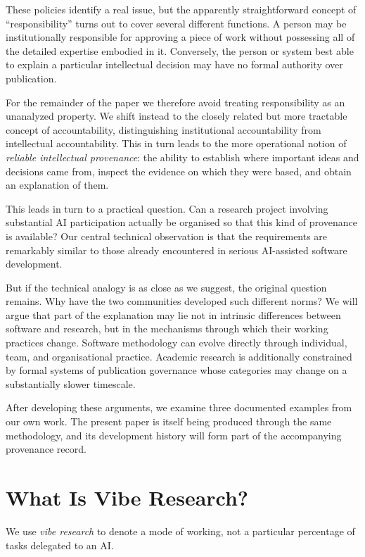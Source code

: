 These policies identify a real issue, but the apparently straightforward concept of ``responsibility'' turns out to cover several different functions. A person may be institutionally responsible for approving a piece of work without possessing all of the detailed expertise embodied in it. Conversely, the person or system best able to explain a particular intellectual decision may have no formal authority over publication.

For the remainder of the paper we therefore avoid treating responsibility as an unanalyzed property. We shift instead to the closely related but more tractable concept of accountability, distinguishing institutional accountability from intellectual accountability. This in turn leads to the more operational notion of \emph{reliable intellectual provenance}: the ability to establish where important ideas and decisions came from, inspect the evidence on which they were based, and obtain an explanation of them.

This leads in turn to a practical question. Can a research project involving substantial AI participation actually be organised so that this kind of provenance is available? Our central technical observation is that the requirements are remarkably similar to those already encountered in serious AI-assisted software development.

But if the technical analogy is as close as we suggest, the original question remains. Why have the two communities developed such different norms? We will argue that part of the explanation may lie not in intrinsic differences between software and research, but in the mechanisms through which their working practices change. Software methodology can evolve directly through individual, team, and organisational practice. Academic research is additionally constrained by formal systems of publication governance whose categories may change on a substantially slower timescale.

After developing these arguments, we examine three documented examples from our own work. The present paper is itself being produced through the same methodology, and its development history will form part of the accompanying provenance record.


\section{What Is Vibe Research?}

We use \emph{vibe research} to denote a mode of working, not a particular percentage of tasks delegated to an AI.

